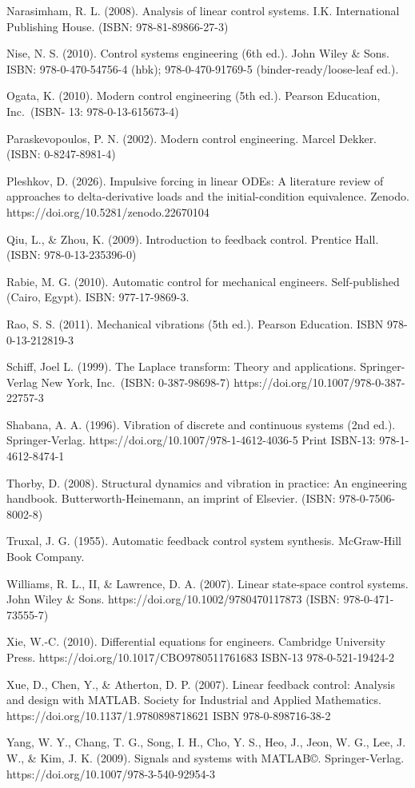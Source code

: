 \documentclass[
  11pt,
]{article}
\begin{document}
Narasimham, R. L. (2008). Analysis of linear control systems. I.K.
International Publishing House. (ISBN: 978-81-89866-27-3)

Nise, N. S. (2010). Control systems engineering (6th ed.). John Wiley \&
Sons. ISBN: 978-0-470-54756-4 (hbk); 978-0-470-91769-5
(binder-ready/loose-leaf ed.).

Ogata, K. (2010). Modern control engineering (5th ed.). Pearson
Education, Inc.~(ISBN- 13: 978-0-13-615673-4)

Paraskevopoulos, P. N. (2002). Modern control engineering. Marcel
Dekker. (ISBN: 0-8247-8981-4)

Pleshkov, D. (2026). Impulsive forcing in linear ODEs: A literature
review of approaches to delta-derivative loads and the initial-condition
equivalence. Zenodo. https://doi.org/10.5281/zenodo.22670104

Qiu, L., \& Zhou, K. (2009). Introduction to feedback control. Prentice
Hall. (ISBN: 978-0-13-235396-0)

Rabie, M. G. (2010). Automatic control for mechanical engineers.
Self-published (Cairo, Egypt). ISBN: 977-17-9869-3.

Rao, S. S. (2011). Mechanical vibrations (5th ed.). Pearson Education.
ISBN 978-0-13-212819-3

Schiff, Joel L. (1999). The Laplace transform: Theory and applications.
Springer-Verlag New York, Inc.~(ISBN: 0-387-98698-7)
https://doi.org/10.1007/978-0-387-22757-3

Shabana, A. A. (1996). Vibration of discrete and continuous systems (2nd
ed.). Springer-Verlag. https://doi.org/10.1007/978-1-4612-4036-5 Print
ISBN-13: 978-1-4612-8474-1

Thorby, D. (2008). Structural dynamics and vibration in practice: An
engineering handbook. Butterworth-Heinemann, an imprint of Elsevier.
(ISBN: 978-0-7506-8002-8)

Truxal, J. G. (1955). Automatic feedback control system synthesis.
McGraw-Hill Book Company.

Williams, R. L., II, \& Lawrence, D. A. (2007). Linear state-space
control systems. John Wiley \& Sons.
https://doi.org/10.1002/9780470117873 (ISBN: 978-0-471-73555-7)

Xie, W.-C. (2010). Differential equations for engineers. Cambridge
University Press. https://doi.org/10.1017/CBO9780511761683 ISBN-13
978-0-521-19424-2

Xue, D., Chen, Y., \& Atherton, D. P. (2007). Linear feedback control:
Analysis and design with MATLAB. Society for Industrial and Applied
Mathematics. https://doi.org/10.1137/1.9780898718621 ISBN
978-0-898716-38-2

Yang, W. Y., Chang, T. G., Song, I. H., Cho, Y. S., Heo, J., Jeon, W.
G., Lee, J. W., \& Kim, J. K. (2009). Signals and systems with MATLAB©.
Springer-Verlag. https://doi.org/10.1007/978-3-540-92954-3
\end{document}
